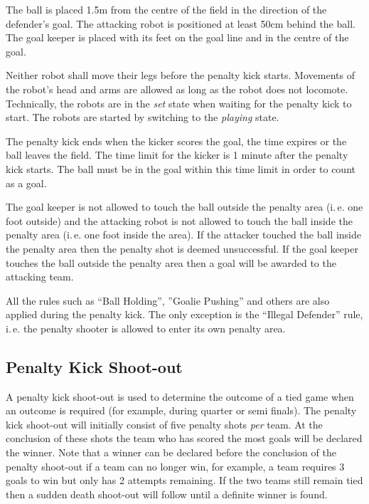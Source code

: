 \documentclass[12pt]{article}
\newcommand{\ie}{\mbox{i.\,e.}\xspace}
\begin{document}
The ball is placed 1.5m from the centre of the field in the direction
of the defender's goal. The attacking robot is positioned
at least 50cm behind the ball. The goal keeper is placed with its feet on the
goal line and in the centre of the goal.

Neither robot shall move their legs before the penalty kick starts. Movements of the
robot's head and arms are allowed as long as the robot does not
locomote. Technically, the robots are in the \emph{set} state when
waiting for the penalty kick to start. The robots are started by
switching to the \emph{playing} state.

The penalty
kick ends when the kicker scores the goal, the time expires or the
ball leaves the field. The time limit for the kicker is 1 minute
after the penalty kick starts. The ball must be in the goal within
this time limit in order to count as a goal.

The goal keeper is not allowed to touch the ball outside the penalty area (\ie one foot
outside) and the attacking robot is not allowed to touch the ball inside the penalty
area (\ie one foot inside the area). If the attacker touched the ball inside the
penalty area then the penalty shot is deemed unsuccessful. If the
goal keeper touches the ball outside the penalty area then a goal will be awarded to the
attacking team.

All the rules such as ``Ball Holding'', ''Goalie Pushing'' and
others are also applied during the penalty kick. The only exception
is the ``Illegal Defender'' rule, \ie the penalty shooter is allowed
to enter its own penalty area.

\subsection{Penalty Kick Shoot-out}
\label{sec:penalty_shoot-out}

A penalty kick shoot-out is used to determine the outcome of a tied
game when an outcome is required (for example, during quarter or semi finals).
The penalty kick shoot-out will initially consist of five
penalty shots \emph{per} team. At the conclusion of these shots the
team who has scored the most goals will be declared the winner. Note
that a winner can be declared before the conclusion of the penalty
shoot-out if a team can no longer win, for example, a team requires 3 goals
to win but only has 2 attempts remaining. If the two teams still
remain tied then a sudden death shoot-out will follow until a
definite winner is found.
\end{document}
